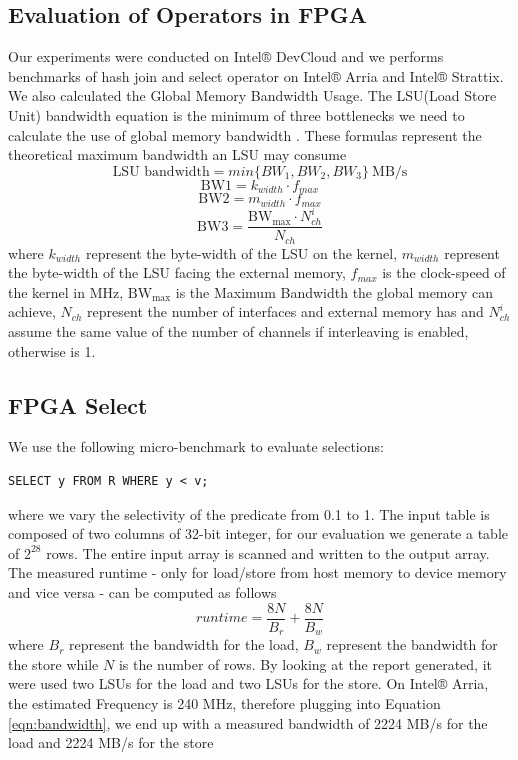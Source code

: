 \documentclass[sigconf, nonacm]{acmart}
\begin{document}
\subsection{Evaluation of Operators in FPGA}
Our experiments were conducted on Intel® DevCloud and we performs benchmarks of hash join and select operator on Intel® Arria and Intel® Strattix. We also calculated the Global Memory Bandwidth Usage.
The LSU(Load Store Unit) bandwidth equation is the minimum of three bottlenecks we need to calculate the use of global memory bandwidth \cite{fpga_optim}. These formulas represent the theoretical maximum bandwidth an LSU may consume
\begin{equation}
\label{eqn:bandwidth}
\text{LSU bandwidth} = min\{BW_1, BW_2, BW_3\} \ \text{MB/s}
\end{equation}
$$ \text{BW1} = k_{width} \cdot f_{max} $$
$$ \text{BW2} = m_{width} \cdot f_{max} $$
$$ \text{BW3} = \frac{\text{BW}_{\text{max}} \cdot N^{i}_{ch}}{N_{ch}}$$
where $k_{width}$ represent the byte-width of the LSU on the kernel, $m_{width}$ represent the byte-width of the LSU facing the external memory, $f_{max}$ is the clock-speed of the kernel in MHz, $\text{BW}_{\text{max}}$ is the Maximum Bandwidth the global memory can achieve, $N_{ch}$ represent the number of interfaces and external memory has and $N^{i}_{ch}$ assume the same value of the number of channels if interleaving is enabled, otherwise is 1.


\subsection{FPGA Select}
We use the following micro-benchmark to evaluate selections:
\begin{verbatim}
SELECT y FROM R WHERE y < v;
\end{verbatim}    
where we vary the selectivity of the predicate from 0.1 to 1.
The input table is composed of two columns of 32-bit integer, for our evaluation we generate a table of $2^{28}$ rows.
The entire input array is scanned and written to the output array. The measured runtime - only for load/store from host memory to device memory and vice versa - can be computed as follows
$$runtime = \frac{8 N}{B_r} + \frac{8 N}{B_w}$$
where $B_r$ represent the bandwidth for the load, $B_w$ represent the bandwidth for the store while $N$ is the number of rows.
By looking at the report generated, it were used two LSUs for the load and two LSUs for the store.
On Intel® Arria, the estimated Frequency is 240 MHz, therefore plugging into Equation \ref{eqn:bandwidth}, we end up with a measured bandwidth of 2224 MB/s for the load and 2224 MB/s for the store
\end{document}
